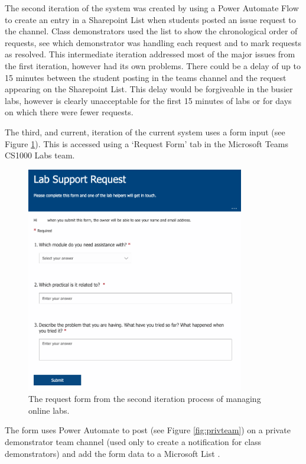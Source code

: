 The second iteration of the system was created by using a Power Automate Flow to create an entry in a Sharepoint List when students posted an issue request to the channel. Class demonstrators used the list to show the chronological order of requests, see which demonstrator was handling each request and to mark requests as resolved. This intermediate iteration addressed most of the major issues from the first iteration, however had its own problems. There could be a delay of up to 15 minutes between the student posting in the teams channel and the request appearing on the Sharepoint List. This delay would be forgiveable in the busier labs, however is clearly unacceptable for the first 15 minutes of labs or for days on which there were fewer requests.

The third, and current, iteration of the current system uses a form input (see Figure \ref{fig:form}). This is accessed using a `Request Form' tab in the Microsoft Teams \cite{teams} CS1000 Labs team. 

\FloatBarrier
\begin{figure}[H]
  \centering
  \includegraphics[width=0.85\textwidth]{2context/images/teams2a.png}
  \caption{The request form from the second iteration process of managing online labs.}
      \label{fig:form}
\end{figure}

The form uses Power Automate \cite{pauto} to post (see Figure \ref{fig:privteam}) on a private demonstrator team channel (used only to create a notification for class demonstrators) and add the form data to a Microsoft List \cite{lists}.

